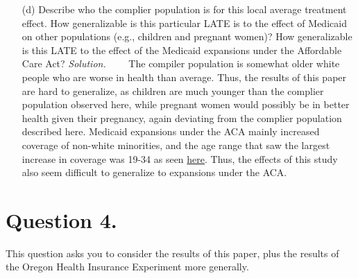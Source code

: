 \documentclass[
]{article}
\begin{document}
\begin{enumerate}
\item[(d)] Describe who the complier population is for this local average treatment effect. How generalizable is this particular LATE is to the effect of Medicaid on other populations (e.g., children and pregnant women)? How generalizable is this LATE to the effect of the Medicaid expansions under the Affordable Care Act?
\newline
\newline
\textit{Solution.} \newline
    The compiler population is somewhat older white people who are worse in health than average. Thus, the results of this paper are hard to generalize, as children are much younger than the complier population observed here, while pregnant women would possibly be in better health given their pregnancy, again deviating from the complier population described here. Medicaid expansions under the ACA mainly increased coverage of non-white minorities, and the age range that saw the largest increase in coverage was 19-34 as seen \textcolor{blue}{\href{https://www.urban.org/sites/default/files/publication/86761/2001041-who-gained-health-insurance-coverage-under-the-aca-and-where-do-they-live.pdf}{here}}. Thus, the effects of this study also seem difficult to generalize to expansions under the ACA. 

\end{enumerate}

\hypertarget{question-4.}{%
\section{Question 4.}\label{question-4.}}

This question asks you to consider the results of this paper, plus the
results of the Oregon Health Insurance Experiment more generally.
\end{document}
